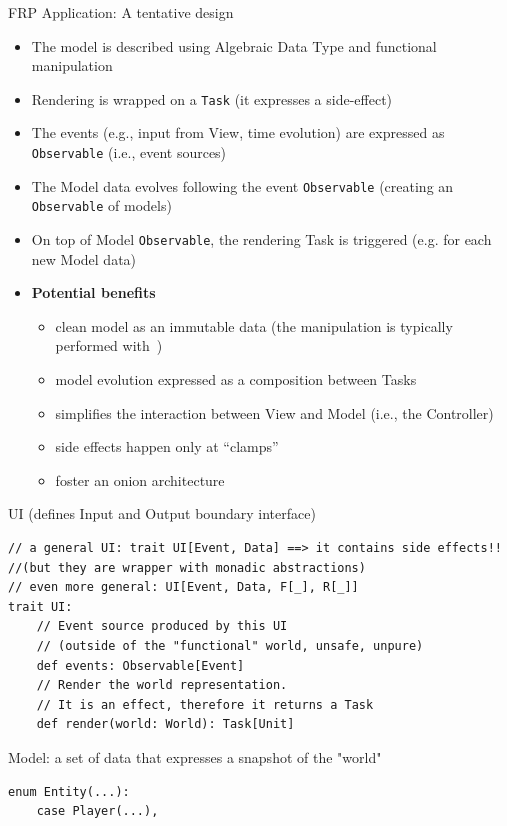 \documentclass[presentation, 9pt]{beamer}\mode<presentation>{\usetheme{AMSBolognaFC}}
\begin{document}
\begin{frame}{FRP Application: A tentative design \href{https://github.com/cric96/scala-frp-gui}{\faLink}}
	\begin{itemize}
		\item The model is described using Algebraic Data Type and functional manipulation
		\item Rendering is wrapped on a \texttt{Task} (it expresses a side-effect)
  	\item The events (e.g., input from View, time evolution) are expressed as \texttt{Observable} (i.e., event sources)
   	\item The Model data evolves following the event \texttt{Observable} (creating an \texttt{Observable} of models)
    \item On top of Model \texttt{Observable}, the rendering Task is triggered (e.g. for each new Model data)
		\item \textbf{Potential benefits}
		\begin{itemize}
			\item clean model as an immutable data (the manipulation is typically performed with \href{https://www.optics.dev/Monocle/}{\faLink} \,)
   		\item model evolution expressed as a composition between Tasks  
			\item simplifies the interaction between View and Model (i.e., the Controller)
   		\item side effects happen only at ``clamps''
   		\item foster an onion architecture
		\end{itemize}
	\end{itemize}
	\begin{alertblock}{UI (defines Input and Output boundary interface)}
	\begin{tcolorbox}[left=0pt, top=0pt, bottom=0pt]
		\begin{verbatim}
// a general UI: trait UI[Event, Data] ==> it contains side effects!! 
//(but they are wrapper with monadic abstractions)
// even more general: UI[Event, Data, F[_], R[_]]
trait UI:
	// Event source produced by this UI 
	// (outside of the "functional" world, unsafe, unpure)
	def events: Observable[Event]
	// Render the world representation. 
	// It is an effect, therefore it returns a Task
	def render(world: World): Task[Unit]
		\end{verbatim}
		\end{tcolorbox}
	\end{alertblock}
	\begin{alertblock}{Model: a set of data that expresses a snapshot of the "world"}
		\begin{tcolorbox}[left=0pt, top=0pt, bottom=0pt]
			\begin{verbatim}
enum Entity(...):
	case Player(...),


\end{verbatim}
\end{tcolorbox}
\end{alertblock}
\end{frame}
\end{document}
